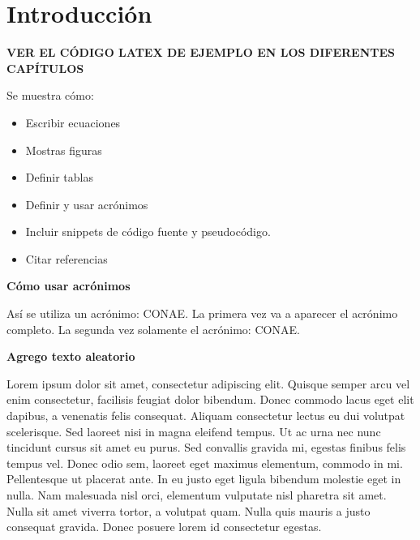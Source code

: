 \chapter{Introducción}

\textbf{VER EL CÓDIGO LATEX DE EJEMPLO EN LOS DIFERENTES CAPÍTULOS}

Se muestra cómo:
\begin{itemize}
	\item Escribir ecuaciones
	\item Mostras figuras
	\item Definir tablas
	\item Definir y usar acrónimos
	\item Incluir snippets de código fuente y pseudocódigo.
	\item Citar referencias
\end{itemize}


\textbf{Cómo usar acrónimos}

Así se utiliza un acrónimo: \gls{CONAE}. La primera vez va a aparecer el acrónimo completo. La segunda vez solamente el acrónimo: \gls{CONAE}.




\textbf{Agrego texto aleatorio}

Lorem ipsum dolor sit amet, consectetur adipiscing elit. Quisque semper arcu vel enim consectetur, facilisis feugiat dolor bibendum. Donec commodo lacus eget elit dapibus, a venenatis felis consequat. Aliquam consectetur lectus eu dui volutpat scelerisque. Sed laoreet nisi in magna eleifend tempus. Ut ac urna nec nunc tincidunt cursus sit amet eu purus. Sed convallis gravida mi, egestas finibus felis tempus vel. Donec odio sem, laoreet eget maximus elementum, commodo in mi. Pellentesque ut placerat ante. In eu justo eget ligula bibendum molestie eget in nulla. Nam malesuada nisl orci, elementum vulputate nisl pharetra sit amet. Nulla sit amet viverra tortor, a volutpat quam. Nulla quis mauris a justo consequat gravida. Donec posuere lorem id consectetur egestas.


